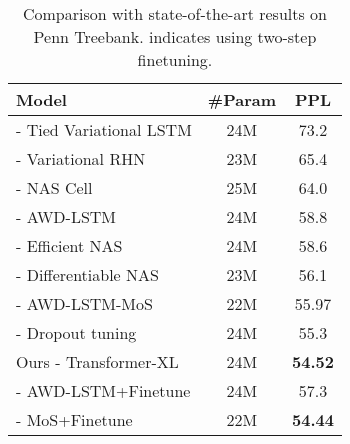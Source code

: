 \documentclass[11pt,a4paper]{article}
\begin{document}
\begin{table}[t]
    \small
    \centering
    \begin{adjustwidth}{-5pt}{}
    \begin{tabular}{l|cc}
        \toprule
        \bf Model & \bf \#Param & \bf PPL \\
        \midrule
\citet{inan2016tying} - Tied Variational LSTM & 24M & 73.2 \\
        \citet{zilly2016recurrent} - Variational RHN & 23M & 65.4 \\
        \citet{zoph2016neural} - NAS Cell & 25M & 64.0 \\
        \citet{merity2017regularizing} - AWD-LSTM & 24M & 58.8 \\
        \citet{pham2018efficient} - Efficient NAS & 24M & 58.6 \\
        \citet{liu2018darts} - Differentiable NAS & 23M & 56.1 \\
        \citet{yang2017breaking} - AWD-LSTM-MoS & 22M & 55.97 \\
        \citet{melis2018pushing} - Dropout tuning & 24M & 55.3 \\
        \midrule
        Ours - Transformer-XL & 24M & \textbf{54.52} \\
        \midrule
        \citet{merity2017regularizing} - AWD-LSTM+Finetune & 24M & 57.3 \\
        \citet{yang2017breaking} - MoS+Finetune & 22M & \textbf{54.44} \\
        \bottomrule
    \end{tabular}
    \caption{\small
        Comparison with state-of-the-art results on Penn Treebank.  indicates using two-step finetuning.
    }
    \label{table:ptb}
	\end{adjustwidth}
\end{table}
\egroup
\end{document}
